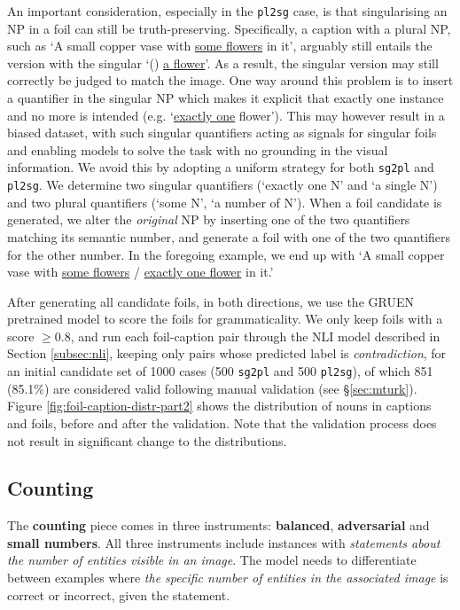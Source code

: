 \documentclass[11pt]{article}
\newcommand{\gr}[1]{\textcolor{niceblue}{#1}}
\newcommand\red[1]{\textcolor{niceorange}{#1}}
\begin{document}
An important consideration, especially in the {\tt pl2sg} case, is that singularising an NP in a foil can still be truth-preserving. Specifically, a caption with a plural NP, such as  `A small copper vase with \underline{some flowers} in it', arguably still entails the version with the singular `(\textellipsis) \underline{a flower}'. As a result, the singular version may still correctly be judged to match the image. One way around this problem is to insert a quantifier in the singular NP which makes it explicit that exactly one instance and no more is intended (e.g. `\underline{exactly one} flower'). This may however result in a biased dataset, with such singular quantifiers acting as signals for singular foils and enabling models to solve the task with no grounding in the visual information. We avoid this by adopting a uniform strategy for both {\tt sg2pl} and {\tt pl2sg}. We determine two singular quantifiers (`exactly one N' and `a single N') and two plural quantifiers (`some N', `a number of N'). When a foil candidate is generated, we alter the {\em original} NP by inserting one of the two quantifiers matching its semantic number, and generate a foil with one of the two quantifiers for the other number.
In the foregoing example, we end up with `A small copper vase with \underline{\gr{some flowers}} / \underline{\red{exactly one flower}} in it.'




After generating all candidate foils, in both directions, we use the GRUEN pretrained model \cite{zhu-bhat-2020-gruen} to score the foils for grammaticality. We only keep foils with a score $\geq 0.8$, and run each foil-caption pair through the NLI model described in Section \ref{subsec:nli}, keeping only pairs whose predicted label is {\em contradiction}, for an initial candidate set of 1000 cases (500 {\tt sg2pl} and 500 {\tt pl2sg}), of which 851 (85.1\%) are considered valid following manual validation (see \S \ref{sec:mturk}).
Figure \ref{fig:foil-caption-distr-part2} shows the distribution of nouns in captions and foils, before and after the validation. Note that the validation process does not result in significant change to the distributions.

\subsection{Counting}\label{app:counting}

The {\bf counting} piece comes in three instruments: {\bf balanced}, {\bf adversarial} and {\bf small numbers}.
All three instruments include instances with \textit{statements about the number of entities visible in an image}.
The model needs to differentiate between examples where \textit{the specific number of entities in the associated image} is correct or incorrect, given the statement.
\end{document}
